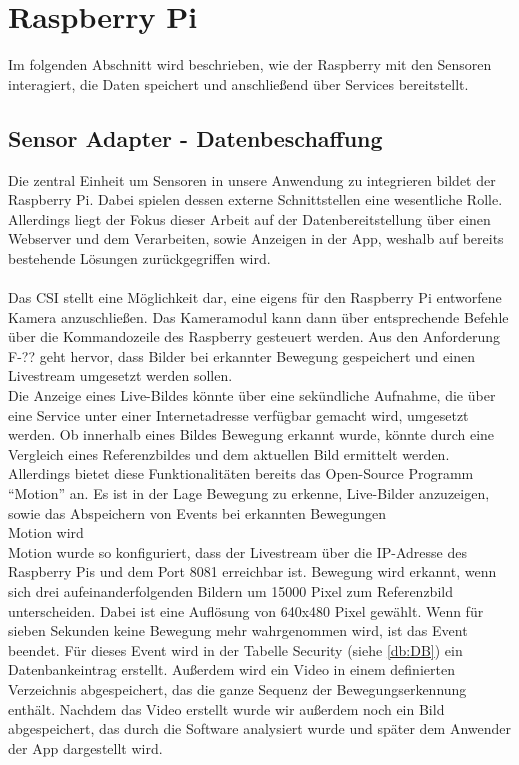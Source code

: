\section{Raspberry Pi} 
Im folgenden Abschnitt wird beschrieben, wie der Raspberry mit den Sensoren interagiert, die Daten speichert und anschließend über Services bereitstellt.

\subsection{Sensor Adapter - Datenbeschaffung}
Die zentral Einheit um Sensoren in unsere Anwendung zu integrieren bildet der Raspberry Pi. Dabei spielen dessen externe Schnittstellen eine wesentliche Rolle. Allerdings liegt der Fokus dieser Arbeit auf der Datenbereitstellung über einen Webserver und dem Verarbeiten, sowie Anzeigen in der App, weshalb auf bereits bestehende Lösungen zurückgegriffen wird.
\\\\Das \acf{CSI} stellt eine Möglichkeit dar, eine eigens für den Raspberry Pi entworfene Kamera anzuschließen. Das Kameramodul kann dann über entsprechende Befehle über die Kommandozeile des Raspberry gesteuert werden. Aus den Anforderung F-?? geht hervor, dass Bilder bei erkannter Bewegung gespeichert und einen Livestream umgesetzt werden sollen.\\Die Anzeige eines Live-Bildes könnte über eine sekündliche Aufnahme, die über eine Service unter einer Internetadresse verfügbar gemacht wird, umgesetzt werden. Ob innerhalb eines Bildes Bewegung erkannt wurde, könnte durch eine Vergleich eines Referenzbildes und dem aktuellen Bild ermittelt werden.\\Allerdings bietet diese Funktionalitäten bereits das Open-Source Programm \enquote{Motion} an. Es ist in der Lage Bewegung zu erkenne, Live-Bilder anzuzeigen, sowie das Abspeichern von Events bei erkannten Bewegungen\cite{motion:Motion}\\
Motion wird 
\\Motion wurde so konfiguriert, dass der Livestream über die \ac{IP}-Adresse des Raspberry Pis und dem Port 8081 erreichbar ist. Bewegung wird erkannt, wenn sich drei aufeinanderfolgenden Bildern um 15000 Pixel zum Referenzbild unterscheiden. Dabei ist eine Auflösung von 640x480 Pixel gewählt. Wenn für sieben Sekunden keine Bewegung mehr wahrgenommen wird, ist das Event beendet. Für dieses Event wird in der Tabelle Security (siehe \autoref{db:DB}) ein Datenbankeintrag erstellt. Außerdem wird ein Video in einem definierten Verzeichnis abgespeichert, das die ganze Sequenz der Bewegungserkennung enthält. Nachdem das Video erstellt wurde wir außerdem noch ein Bild abgespeichert, das durch die Software analysiert wurde und später dem Anwender der App dargestellt wird.
